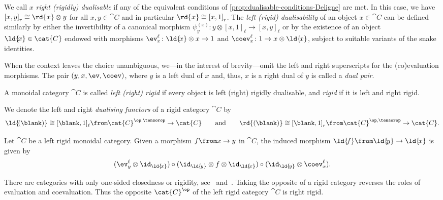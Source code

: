 \begin{definition}\label{def:rigidly-dualisable}
  We call \(x\) \emph{right (rigidly) dualisable}
  if any of the equivalent conditions of \cref{prop:dualisable-conditions-Deligne} are met.
  In this case, we have \({[x, y]}_r \cong \rd{x} \otimes y\) for all \(x, y \in \cat{C}\) and in particular \(\rd{x} \cong {[x, 1]}_r\).
  The \emph{left (rigid) dualisability} of an object \(x\in\cat{C}\) can be defined similarly by either the invertibility of a canonical morphism
  \(\psi^{(x)}_y \colon y \otimes {[x,1]}_{\ell} \to {[x,y]}_{\ell}\) or by the existence of an object \(\ld{\!{}x} \in\cat{C}\)
  endowed with morphisms \(\ev^{\ell}_x \colon \ld{\!{}x} \otimes x \to 1\) and \(\coev^{\ell}_x \colon 1 \to x \otimes \ld{\!{}x}\),
  subject to suitable variants of the snake identities.
\end{definition}

When the context leaves the choice unambiguous,
we—in the interest of brevity—omit the left and right superscripts for the (co)evaluation morphisms.
The pair \((y, x, \ev, \coev)\),
where \(y\) is a left dual of \(x\) and, thus, \(x\) is a right dual of \(y\)
is called a \emph{dual pair}.

\begin{definition}
  A monoidal category \(\cat{C}\) is called \emph{left (right) rigid}
  if every object is left (right) rigidly dualisable,
  and \emph{rigid} if it is left and right rigid.

  We denote the left and right \emph{dualising functors} of a rigid category \(\cat{C}\) by
  \[
    \ld{\!(\blank)} \cong {[\blank, 1]}_{\ell}\from \cat{C}^{\op,\tensorop} \to \cat{C}
    \qquad\text{and}\qquad
    \rd{(\blank)} \cong {[\blank, 1]}_{r}\from \cat{C}^{\op,\tensorop} \to \cat{C}.
  \]
\end{definition}

\begin{example}\label{ex:left-dualising-functor}
  Let \(\cat{C}\) be a left rigid monoidal category.
  Given a morphism \(f \from x \to y\) in \(\cat{C}\),
  the induced morphism \(\ld{\!{}f}\from \ld{\!{}y} \to \ld{\!{}x}\) is given by
  \[
    (\ev_y^{\ell} \otimes \id_{\ld{\!{}x}}) \circ (\id_{\ld{\!{}y}} \otimes f \otimes \id_{\ld{\!{}x}}) \circ (\id_{\ld{\!{}y}} \otimes \coev_x^{\ell}).
  \]
\end{example}

There are categories with only one-sided closedness or rigidity, see~\cite[Theorem~6.3.3]{loregian2021} and~\cite[Example~1.6.2]{Turaev2017}.
Taking the opposite of a rigid category reverses the roles of evaluation and coevaluation.
Thus the opposite \(\cat{C}^{\op}\) of the left rigid category \(\cat{C}\) is right rigid.

